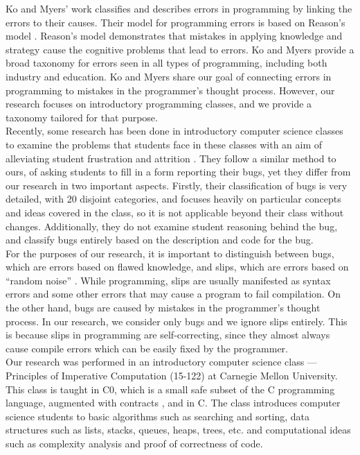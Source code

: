 \documentclass{sig-alternate}
\begin{document}
Ko and Myers' work \cite{KoMyers03} classifies and describes errors in programming by linking the errors to their causes. Their model for programming errors is based on Reason's model \cite{Reason90}. Reason's model demonstrates that mistakes in applying knowledge and strategy cause the cognitive problems that lead to errors. Ko and Myers provide a broad taxonomy for errors seen in all types of programming, including both industry and education. Ko and Myers share our goal of connecting errors in programming to mistakes in the programmer's thought process. However, our research focuses on introductory programming classes, and we provide a taxonomy tailored for that purpose.\\

Recently, some research has been done in introductory computer science classes to examine the problems that students face in these classes with an aim of alleviating student frustration and attrition \cite{BryceCooleyHansenHayrapetyan10}. They follow a similar method to ours, of asking students to fill in a form reporting their bugs, yet they differ from our research in two important aspects. Firstly, their classification of bugs is very detailed, with 20 disjoint categories, and focuses heavily on particular concepts and ideas covered in the class, so it is not applicable beyond their class without changes. Additionally, they do not examine student reasoning behind the bug, and classify bugs entirely based on the description and code for the bug.\\

For the purposes of our research, it is important to distinguish between bugs, which are errors based on flawed knowledge, and slips, which are errors based on ``random noise'' \cite{VanLehn90}. While programming, slips are usually manifested as syntax errors and some other errors that may cause a program to fail compilation. On the other hand, bugs are caused by mistakes in the programmer's thought process. In our research, we consider only bugs and we ignore slips entirely. This is because slips in programming are self-correcting, since they almost always cause compile errors which can be easily fixed by the programmer.\\

Our research was performed in an introductory computer science class --- Principles of Imperative Computation (15-122) at Carnegie Mellon University. This class is taught in C0, which is a small safe subset of the C programming language, augmented with contracts \cite{Arnold10, PfenningCortinaLovas11}, and in C. The class introduces computer science students to basic algorithms such as searching and sorting, data structures such as lists, stacks, queues, heaps, trees, etc. and computational ideas such as complexity analysis and proof of correctness of code.
\end{document}
